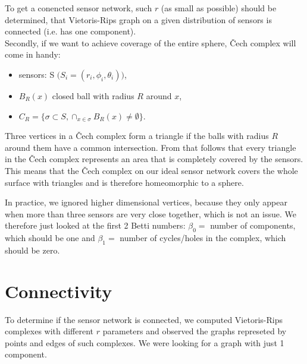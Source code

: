 \documentclass[a4paper, 12pt]{article}
\begin{document}
To get a conencted sensor network, such $r$ (as small as possible) should be determined, that Vietoris-Rips graph on a given distribution of sensors is connected (i.e. has one component).
\\

Secondly, if we want to achieve coverage of the entire sphere, Čech complex will come in handy:

\begin{itemize}
	\item {sensors: S $\big(S_i = (r_i, \phi_i, \theta_i)\big)$,}
	\item {$B_R(x)$ closed ball with radius $R$ around $x$,}
	\item {$C_R = \{\sigma \subset S,\cap_{x\in \sigma}B_R(x) \neq \emptyset \}$.
	}
\end{itemize}

 Three vertices in a Čech complex form a triangle if the balls with radius $R$ around them have a common intersection. From that follows that every triangle in the Čech complex represents an area that is completely covered by the sensors. This means that the \v Cech complex on our ideal sensor network covers the whole surface with triangles and is therefore homeomorphic to a sphere. 

In practice, we ignored higher dimensional vertices, because they only appear when more than three sensors are very close together, which is not an issue. We therefore just looked at the first 2 Betti numbers: $\beta_0 = $ number of components, which should be one and $\beta_1 = $ number of cycles/holes in the complex, which should be zero.

\clearpage

\section{Connectivity}
To determine if the sensor network is connected, we computed Vietoris-Rips complexes with different $r$ parameters and observed the graphs represeted by points and edges of such complexes. We were looking for a graph with just 1 component.
\end{document}
